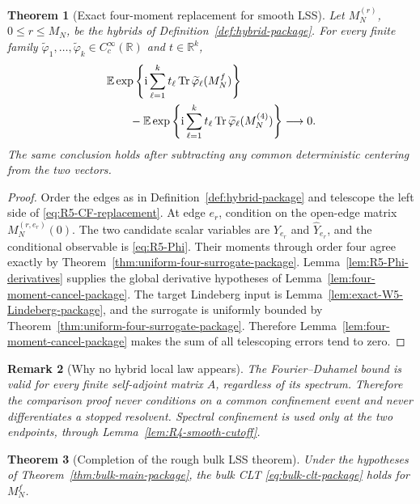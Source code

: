 \documentclass[10pt,a4paper]{amsart}
\newtheorem{theorem}{Theorem}[section]
\newtheorem{remark}[theorem]{Remark}
\newcommand{\E}{\mathbb E}
\newcommand{\Tr}{\operatorname{Tr}}
\newcommand{\ii}{\mathrm i}
\begin{document}
\begin{theorem}[Exact four-moment replacement for smooth LSS]
\label{thm:R5-smooth-replacement}
Let \(M_N^{(r)}\), \(0\le r\le M_N\), be the hybrids of
Definition~\ref{def:hybrid-package}.  For every finite family
\(\widetilde\varphi_1,\ldots,\widetilde\varphi_k\in C_c^\infty(\mathbb R)\)
and \(t\in\mathbb R^k\),
\begin{align}
 &\E\exp\left\{\ii\sum_{\ell=1}^kt_\ell
 \Tr\widetilde\varphi_\ell(M_N^f)\right\}
 \notag\\
 &\qquad-
 \E\exp\left\{\ii\sum_{\ell=1}^kt_\ell
 \Tr\widetilde\varphi_\ell(M_N^{(4)})\right\}
 \longrightarrow0.
 \label{eq:R5-CF-replacement}
\end{align}
The same conclusion holds after subtracting any common deterministic
centering from the two vectors.
\end{theorem}

\begin{proof}
Order the edges as in Definition~\ref{def:hybrid-package} and telescope the
left side of \eqref{eq:R5-CF-replacement}.  At edge \(e_r\), condition on
the open-edge matrix \(M_N^{(r,e_r)}(0)\).  The two candidate scalar
variables are \(Y_{e_r}\) and \(\widehat Y_{e_r}\), and the conditional
observable is \eqref{eq:R5-Phi}.  Their moments through order four agree
exactly by Theorem~\ref{thm:uniform-four-surrogate-package}.
Lemma~\ref{lem:R5-Phi-derivatives} supplies the global derivative hypotheses
of Lemma~\ref{lem:four-moment-cancel-package}.  The target Lindeberg input is
Lemma~\ref{lem:exact-W5-Lindeberg-package}, and the surrogate is uniformly
bounded by Theorem~\ref{thm:uniform-four-surrogate-package}.  Therefore
Lemma~\ref{lem:four-moment-cancel-package} makes the sum of all telescoping
errors tend to zero.
\end{proof}

\begin{remark}[Why no hybrid local law appears]
The Fourier--Duhamel bound is valid for every finite self-adjoint matrix
\(A\), regardless of its spectrum.  Therefore the comparison proof never
conditions on a common confinement event and never differentiates a stopped
resolvent.  Spectral confinement is used only at the two endpoints, through
Lemma~\ref{lem:R4-smooth-cutoff}.
\end{remark}

\begin{theorem}[Completion of the rough bulk LSS theorem]
\label{thm:R5-rough-bulk}
Under the hypotheses of Theorem~\ref{thm:bulk-main-package}, the bulk CLT
\eqref{eq:bulk-clt-package} holds for \(M_N^f\).
\end{theorem}
\end{document}

